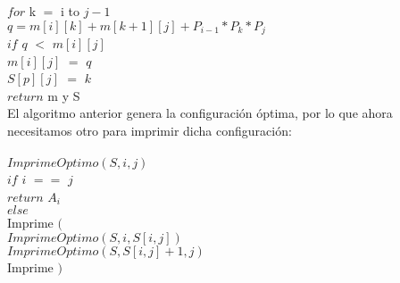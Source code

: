 \documentclass[12pt,twoside]{article}
\begin{document}
\hspace*{2.5cm}$for$ k $=$ i to $j-1$\\
\hspace*{3cm}$q=m[i][k]+m[k+1][j]+P_{i-1}*P_{k}*P_{j}$\\
\hspace*{3cm}$if$ $q$ $<$ $m[i][j]$\\
\hspace*{3.5cm}$m[i][j]$ $=$ $q$\\
\hspace*{3.5cm}$S[p][j]$ $=$ $k$\\
\hspace*{1cm}$return$ m y S\\
\newpage
El algoritmo anterior genera la configuraci\'on \'optima, por lo que ahora necesitamos otro para imprimir dicha configuraci\'on:\\\\
\hspace*{1cm}$ImprimeOptimo(S,i,j)$\\
\hspace*{1cm}$if$ $i$ $==$ $j$\\
\hspace*{1.5cm}$return$ $A_{i}$\\
\hspace*{1cm}$else$\\
\hspace*{1.5cm}Imprime $($\\
\hspace*{1.5cm}$ImprimeOptimo(S,i,S[i,j])$\\
\hspace*{1.5cm}$ImprimeOptimo(S,S[i,j]+1,j)$\\
\hspace*{1.5cm}Imprime $)$\\
\end{document}
